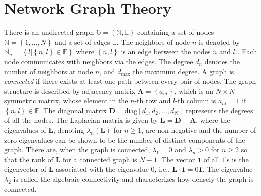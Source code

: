 \documentclass[journal]{IEEEtran}
\begin{document}
\vspace{-1mm}
\section{Network Graph Theory}\label{graph_theory} 

There is an undirected graph $\mathbb{G} = \left(\mathbb{N},\mathbb{E}\right)$ containing a set of nodes $\mathbb{N} = \left\{1,\ldots,N\right\}$ and a set of edges $\mathbb{E}$. The neighbors of node $n$ is denoted by $\mathbb{N}_n = \left\{ l | \left\{n,l\right\} \in \mathbb{E}\right\}$ where $\left\{n,l\right\}$ is an edge between the nodes $n$ and $l$ \cite{Chung97a}. Each node communicates with neighbors via the edges. The degree $d_n$ denotes the number of neighbors at node $n$, and $d_{\text{max}}$ the maximum degree. A graph is \emph{connected} if there exists at least one path between every pair of nodes. The graph structure is described by adjacency matrix $\mathbf{A} = \left\{a_{nl}\right\}$, which is an $N \times N$ symmetric matrix, whose element in the $n$-th row and $l$-th column is $a_{nl} = 1$ if $\left\{n,l\right\} \in \mathbb{E}$. The diagonal matrix $\mathbf{D} = \mathrm{diag}\left[d_1,d_2,\ldots,d_N\right]$ represents the degrees of all the nodes. The Laplacian matrix is given by $\mathbf{L} = \mathbf{D} - \mathbf{A}$, where the eigenvalues of $\mathbf{L}$, denoting $\lambda_{n}(\mathbf{L})$ for $n \ge 1$, are non-negative and the number of zero eigenvalues can be shown to be the number of distinct components of the graph. There are, when the graph is connected, $\lambda_{1} = 0$ and $\lambda_{n} > 0$ for $n \ge 2$ so that the rank of $\mathbf{L}$ for a connected graph is $N-1$. The vector $\mathbf{1}$ {}{of all $1$'s} is the eigenvector of $\mathbf{L}$ associated with the eigenvalue $0$, i.e., $\mathbf{L}\cdot\mathbf{1} = 0\mathbf{1}$. The eigenvalue $\lambda_{2}$ is called the algebraic connectivity and characterizes how densely the graph is connected. 
\end{document}
